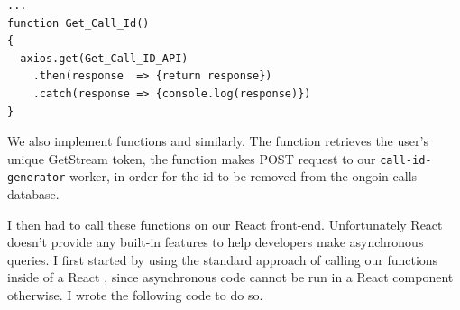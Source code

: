 \begin{verbatim}
...
function Get_Call_Id()
{
  axios.get(Get_Call_ID_API)
    .then(response  => {return response})
    .catch(response => {console.log(response)})
}
\end{verbatim}

We also implement functions  and
 similarly. The 
function retrieves the user's unique GetStream token, the
 function makes POST request to our
\texttt{call-id-generator} worker, in order for the id to be
removed from the ongoin-calls database. \\ \vspace{0.2cm}

I then had to call these functions on our React front-end.
Unfortunately React doesn't provide any built-in features to
help developers make asynchronous queries. I first started
by using the standard approach of calling our functions
inside of a React , since asynchronous code
cannot be run in a React component otherwise. I wrote the
following code to do so.

